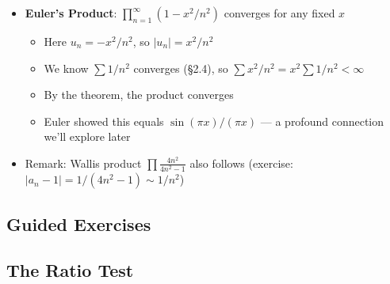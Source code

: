 \documentclass[
  10pt,
  letterpaper,
]{scrbook}
\providecommand{\tightlist}{%
  \setlength{\itemsep}{0pt}\setlength{\parskip}{0pt}}
\begin{document}
\begin{itemize}
  \begin{itemize}
  \tightlist
  \item
    Need to show \(\sum |r_n/2 - 1| < \infty\)
  \item
    Let \(e_n = 2 - r_n\). Then \(|r_n/2 - 1| = |r_n - 2|/2 = e_n/2\)
  \item
    Claim: \(e_{n+1} \leq e_n/2\) (geometric decay)
  \item
    Proof: \(e_{n+1} = 2 - \sqrt{4 - e_n} = 2(1 - \sqrt{1 - e_n/4})\)
  \item
    Use \(\sqrt{1-x} \geq 1 - x\) for \(0 \leq x \leq 1\) (proof: square
    both sides)
  \item
    So \(\sqrt{1 - e_n/4} \geq 1 - e_n/4\), giving
    \(e_{n+1} \leq 2 \cdot e_n/4 = e_n/2\)
  \item
    Thus \(e_n \leq (2-\sqrt{2}) \cdot 2^{-(n-1)}\), so
    \(\sum e_n < \infty\)
  \item
    By the theorem, \(\prod r_n/2\) converges to a positive limit
  \item
    The value is \(2/\pi\) --- proved in §4.5 using Archimedes' polygon
    method
  \end{itemize}
\item
  \textbf{Euler's Product}: \(\prod_{n=1}^{\infty}(1 - x^2/n^2)\)
  converges for any fixed \(x\)

  \begin{itemize}
  \tightlist
  \item
    Here \(u_n = -x^2/n^2\), so \(|u_n| = x^2/n^2\)
  \item
    We know \(\sum 1/n^2\) converges (§2.4), so
    \(\sum x^2/n^2 = x^2 \sum 1/n^2 < \infty\)
  \item
    By the theorem, the product converges
  \item
    Euler showed this equals \(\sin(\pi x)/(\pi x)\) --- a profound
    connection we'll explore later
  \end{itemize}
\item
  Remark: Wallis product \(\prod \frac{4n^2}{4n^2-1}\) also follows
  (exercise: \(|a_n - 1| = 1/(4n^2-1) \sim 1/n^2\))
\end{itemize}

\subsection{Guided Exercises}\label{guided-exercises-11}

\subsection{The Ratio Test}\label{the-ratio-test}
\end{document}
